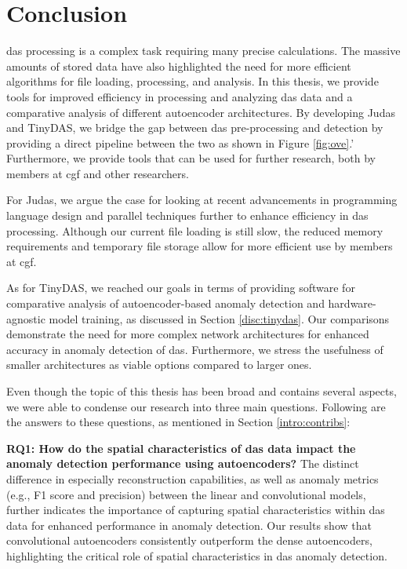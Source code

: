 \section{Conclusion}
\label{conc:conc}

\acrshort{das} processing is a complex task requiring many precise calculations. The massive amounts of stored data have also highlighted the need for more efficient algorithms for file loading, processing, and analysis. In this thesis, we provide tools for improved efficiency in processing and analyzing \acrshort{das} data and a comparative analysis of different autoencoder architectures. By developing
Judas and TinyDAS, we bridge the gap between \acrshort{das} pre-processing and detection by providing a direct pipeline between the two as shown in Figure \ref{fig:ove}.' Furthermore, we provide tools that can be used for further research, both by members at \acrshort{cgf} and other researchers.

For Judas, we argue the case for looking at recent advancements in programming language design and parallel techniques further to enhance efficiency in \acrshort{das} processing. Although our current file loading is still slow, the reduced memory requirements and temporary file storage allow for more efficient use by members at \acrshort{cgf}.

As for TinyDAS, we reached our goals in terms of providing software for comparative analysis of autoencoder-based anomaly detection and hardware-agnostic model training, as discussed in Section \ref{disc:tinydas}. Our comparisons demonstrate the need for more complex network architectures for enhanced accuracy in anomaly detection of \acrshort{das}. Furthermore, we stress the usefulness of smaller architectures as viable options compared to larger ones.

Even though the topic of this thesis has been broad and contains several aspects, we were able to condense our research into three main questions. Following are the answers to these questions, as mentioned in Section \ref{intro:contribs}:

\textbf{RQ1: How do the spatial characteristics of \acrshort{das} data impact the anomaly detection performance using autoencoders?}
The distinct difference in especially reconstruction capabilities, as well as anomaly metrics (e.g., F1 score and precision) between the linear and convolutional models, further indicates the importance of capturing spatial characteristics within \acrshort{das} data for enhanced performance in anomaly detection. Our results show that convolutional autoencoders consistently outperform the dense autoencoders, highlighting the critical role of spatial characteristics in \acrshort{das} anomaly detection.

